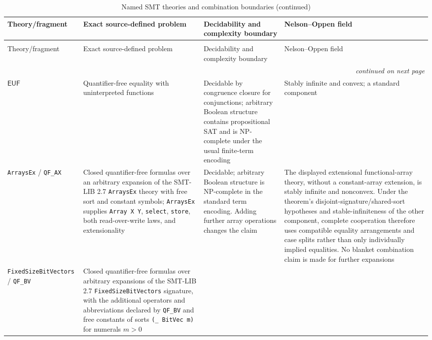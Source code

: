 \begin{landscape}
\thispagestyle{plain}
\begingroup\scriptsize
\setlength{\tabcolsep}{3pt}
\begin{longtable}{@{}p{.95in}p{1.90in}p{2.15in}p{2.15in}@{}}
\caption{Named SMT theories and combination boundaries.}
\label{tab:p12-smt-theories}\\
\toprule
Theory/fragment & Exact source-defined problem & Decidability and complexity boundary
& Nelson--Oppen field \\ \midrule
\endfirsthead
\caption[]{Named SMT theories and combination boundaries (continued)}\\
\toprule
Theory/fragment & Exact source-defined problem & Decidability and complexity boundary
& Nelson--Oppen field \\ \midrule
\endhead
\midrule\multicolumn{4}{r}{\emph{continued on next page}}\\
\endfoot
\endlastfoot
\(\mathsf{EUF}\) & Quantifier-free equality with uninterpreted functions &
Decidable by congruence closure for conjunctions; arbitrary Boolean structure
contains propositional SAT and is NP-complete under the usual finite-term
encoding & Stably infinite and convex; a standard component
\cite{BarrettSebastianiSeshiaTinelli2009} \\ \addlinespace
\texttt{ArraysEx} / \texttt{QF\_AX} & Closed quantifier-free formulas over
an arbitrary expansion of the SMT-LIB 2.7 \texttt{ArraysEx} theory with free
sort and constant symbols; \texttt{ArraysEx} supplies \texttt{Array X Y},
\texttt{select}, \texttt{store}, both read-over-write laws, and extensionality &
Decidable; arbitrary Boolean
structure is NP-complete in the standard term encoding.  Adding further array
operations changes the claim & The displayed extensional functional-array
theory, without a constant-array extension, is stably infinite and nonconvex.
Under the theorem's disjoint-signature/shared-sort hypotheses and
stable-infiniteness of the other component, complete cooperation therefore
uses compatible equality arrangements and case splits rather than only
individually implied equalities.  No blanket combination claim is made for
further expansions
\cite{SMTLIB2025,BarrettSebastianiSeshiaTinelli2009} \\
\addlinespace
\texttt{FixedSizeBitVectors} / \texttt{QF\_BV} & Closed quantifier-free
formulas over arbitrary expansions of the SMT-LIB 2.7
\texttt{FixedSizeBitVectors} signature, with the additional operators and
abbreviations declared by \texttt{QF\_BV} and free constants of sorts
\texttt{(\_ BitVec m)} for numerals \(m>0\) &

\end{longtable}
\end{landscape}
